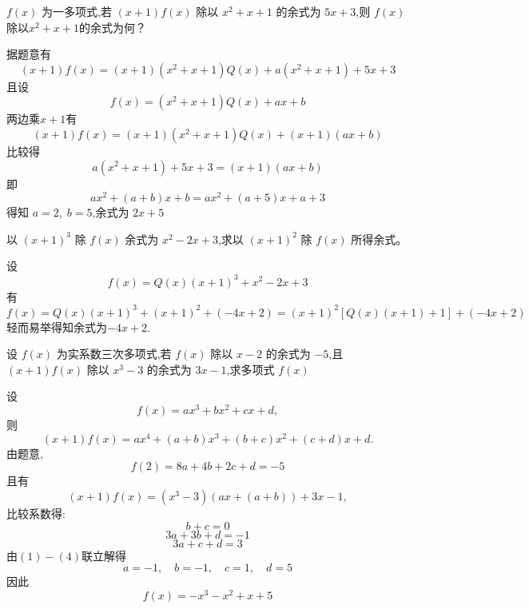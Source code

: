 \begin{questions}
    
    \question $f(x)$ 为一多项式,若 $(x+1) f(x)$ 除以 $x^2 + x + 1$ 的余式为 $5x + 3$,则 $f(x)$ 除以$x^2 + x + 1$的余式为何？
    \begin{solution}
        据题意有$$(x+1)f(x)=(x+1)(x^2 + x + 1)Q(x)+a(x^2+x+1)+5x+3$$
        且设$$f(x)=(x^2 + x + 1)Q(x)+ax+b$$
        两边乘$x+1$有$$(x+1)f(x)=(x+1)(x^2 + x + 1)Q(x)+(x+1)(ax+b)$$
        比较得 $$a(x^2+x+1)+5x+3=(x+1)(ax+b)$$
        即 $$ax^2+(a+b)x+b=ax^2+(a+5)x+a+3 $$
        得知 $a=2,\;b=5$,余式为 $2x+5$
    \end{solution}
    
    \question 以 $(x+1)^3$ 除 $f(x)$ 余式为 $x^2 - 2x + 3$,求以 $(x+1)^2$ 除 $f(x)$ 所得余式。
    \begin{solution}
        设\[
        f(x)=Q(x)(x+1)^{3}+x^{2}-2x+3
        \]
        有\[
        f(x)=Q(x)(x+1)^{3}+(x+1)^{2}+(-4x+2) =(x+1)^{2}[Q(x)(x+1)+1]+(-4x+2)  
        \]
        轻而易举得知余式为$-4x + 2$.
    \end{solution}

    \question 设 $f(x)$ 为实系数三次多项式,若 $f(x)$ 除以 $x-2$ 的余式为 $-5$,且 $(x+1)f(x)$ 除以 $x^3-3$ 的余式为 $3x-1$,求多项式 $f(x)$ 
    \begin{solution}
        设 
        \[
        f(x) = a x^3 + b x^2 + c x + d,
        \]
        则
        \[
        (x+1) f(x) = a x^4 + (a + b) x^3 + (b + c) x^2 + (c + d) x + d.
        \]
        由题意,
        \[
        f(2) = 8a + 4b + 2c + d = -5 \tag{1}
        \]
        且有
        \[
        (x+1) f(x) = (x^3 - 3)(a x + (a + b)) + 3x - 1,
        \]
        比较系数得:
        \[
        b + c = 0 \tag{2}
        \]
        \[
        3a + 3b + d = -1 \tag{3}
        \]
        \[
        3a + c + d = 3 \tag{4}
        \]
        由$(1)-(4)$联立解得
        \[
        a = -1, \quad b = -1, \quad c = 1, \quad d = 5
        \]
        因此
        \[
        f(x)=-x^3-x^2+x+5
        \]
    \end{solution}


\end{questions}
